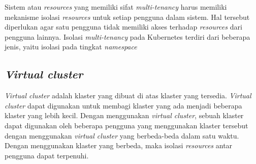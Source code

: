 Sistem atau \emph{resources} yang memiliki sifat \emph{multi-tenancy} harus memiliki
mekanisme isolasi \emph{resources} untuk setiap pengguna dalam sistem. Hal tersebut
diperlukan agar satu pengguna tidak memiliki akses terhadap \emph{resources} dari
pengguna lainnya. Isolasi \emph{multi-tenancy} pada Kubernetes terdiri dari beberapa
jenis, yaitu isolasi pada tingkat \emph{namespace}

\subsection{\emph{Virtual cluster}}

\emph{Virtual cluster} adalah klaster yang dibuat di atas klaster yang tersedia.
\emph{Virtual cluster} dapat digunakan untuk membagi klaster yang ada menjadi beberapa
klaster yang lebih kecil. Dengan menggunakan \emph{virtual cluster}, sebuah klaster
dapat digunakan oleh beberapa pengguna yang menggunakan klaster tersebut dengan
menggunakan \emph{virtual cluster} yang berbeda-beda dalam satu waktu. Dengan
menggunakan klaster yang berbeda, maka isolasi \emph{resources} antar pengguna
dapat terpenuhi.
